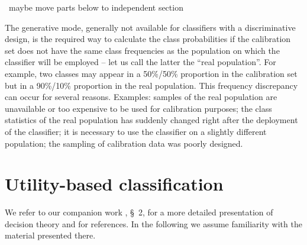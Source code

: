 \documentclass[\ifafour a4paper,12pt,\else a5paper,10pt,\fi%
onecolumn,oneside,article,%
british%
]{memoir}
\theoremstyle{remark}
\theoremstyle{innote}
\newcommand*{\puzzle}{{\fontencoding{U}\fontfamily{fontawesometwo}\selectfont\symbol{225}}}
\newcommand*{\wrench}{{\fontencoding{U}\fontfamily{fontawesomethree}\selectfont\symbol{114}}}
\newcommand{\mynotew}[1]{{\footnotesize\color{notecolour}\wrench\ #1}}
\newcommand{\mynotez}[1]{{\footnotesize\color{notecolour}\puzzle\ #1}}
\newcommand*{\p}{\mathrm{p}}%
\renewcommand*{\|}[1][]{\nonscript\:#1\vert\nonscript\:\mathopen{}}
\newcommand*{\sect}{\S}%
\begin{document}
\mynotew{maybe move parts below to independent section}

The generative mode, generally not available for classifiers with a discriminative design, is the required way to calculate the class probabilities if the calibration set does not have the same class frequencies as the population on which the classifier will be employed -- let us call the latter the \enquote{real population}. For example, two classes may appear in a 50\%/50\% proportion in the calibration set but in a  90\%/10\% proportion in the real population. This frequency discrepancy can occur for several reasons.  Examples: samples of the real population are unavailable or too expensive to be used for calibration purposes; the class statistics of the real population has suddenly changed right after the deployment of the classifier; it is necessary to use the classifier on a slightly different population; the sampling of calibration data was poorly designed.


\section{Utility-based classification}
\label{sec:utility_classification}

We refer to our companion work \cite{dyrlandetal2022}, \sect~2, for a more detailed presentation of decision theory and for references. In the following we assume familiarity with the material presented there.
\end{document}
